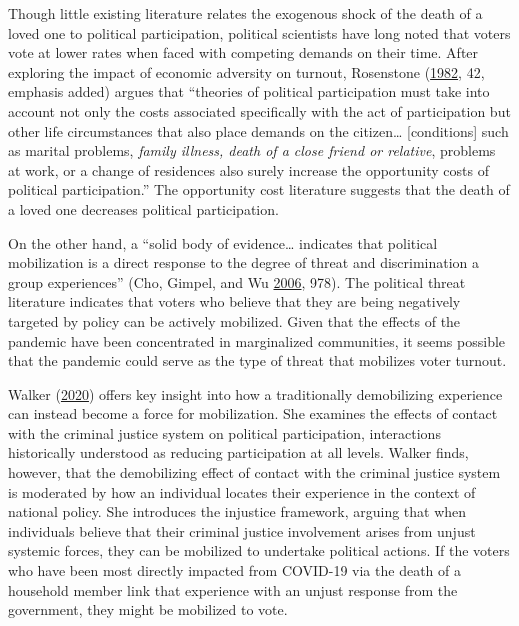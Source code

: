 \documentclass[
  12pt,
]{article}
\begin{document}
Though little existing literature relates the exogenous shock of the death of a loved one to political participation, political scientists have long noted that voters vote at lower rates when faced with competing demands on their time. After exploring the impact of economic adversity on turnout, Rosenstone (\protect\hyperlink{ref-Rosenstone1982}{1982}, 42, emphasis added) argues that ``theories of political participation must take into account not only the costs associated specifically with the act of participation but other life circumstances that also place demands on the citizen\ldots{} {[}conditions{]} such as marital problems, \emph{family illness, death of a close friend or relative}, problems at work, or a change of residences also surely increase the opportunity costs of political participation.'' The opportunity cost literature suggests that the death of a loved one decreases political participation.

On the other hand, a ``solid body of evidence\ldots{} indicates that political mobilization is a direct response to the degree of threat and discrimination a group experiences'' (Cho, Gimpel, and Wu \protect\hyperlink{ref-Cho2006a}{2006}, 978). The political threat literature indicates that voters who believe that they are being negatively targeted by policy can be actively mobilized. Given that the effects of the pandemic have been concentrated in marginalized communities, it seems possible that the pandemic could serve as the type of threat that mobilizes voter turnout.

Walker (\protect\hyperlink{ref-Walker2020a}{2020}) offers key insight into how a traditionally demobilizing experience can instead become a force for mobilization. She examines the effects of contact with the criminal justice system on political participation, interactions historically understood as reducing participation at all levels. Walker finds, however, that the demobilizing effect of contact with the criminal justice system is moderated by how an individual locates their experience in the context of national policy. She introduces the injustice framework, arguing that when individuals believe that their criminal justice involvement arises from unjust systemic forces, they can be mobilized to undertake political actions. If the voters who have been most directly impacted from COVID-19 via the death of a household member link that experience with an unjust response from the government, they might be mobilized to vote.
\end{document}

